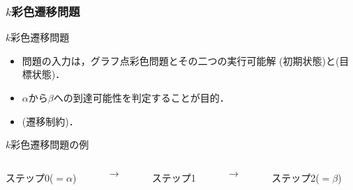 \documentclass[dvipdfmx,11pt]{beamer}
\begin{document}
\begin{frame}\frametitle{$k$彩色遷移問題}

  \begin{block}{$k$彩色遷移問題}
    \begin{itemize}
    \item 問題の入力は，グラフ点彩色問題とその二つの実行可能解
      \structure{$\alpha$}(初期状態)と\structure{$\beta$}(目標状態)．
    \item $\alpha$から$\beta$への到達可能性を判定することが目的．
    \item {} (遷移制約)．
    \end{itemize}
  \end{block}

  \begin{exampleblock}{$k$彩色遷移問題の例}
    \begin{columns}
      \begin{column}{0.3\textwidth}
        \centering
        
        ステップ0($=\alpha$)
      \end{column}
      \begin{column}{0.05\textwidth}
        \textbf{$\longrightarrow$}
      \end{column}
      \begin{column}[]{0.3\textwidth}
        \centering
        
        ステップ1
      \end{column}
      \begin{column}{0.05\textwidth}
        \textbf{$\longrightarrow$}
      \end{column}
      \begin{column}{0.3\textwidth}
        \centering
        
        ステップ2($=\beta$)
      \end{column}
    \end{columns}
  \end{exampleblock}
  
\end{frame}
\end{document}

